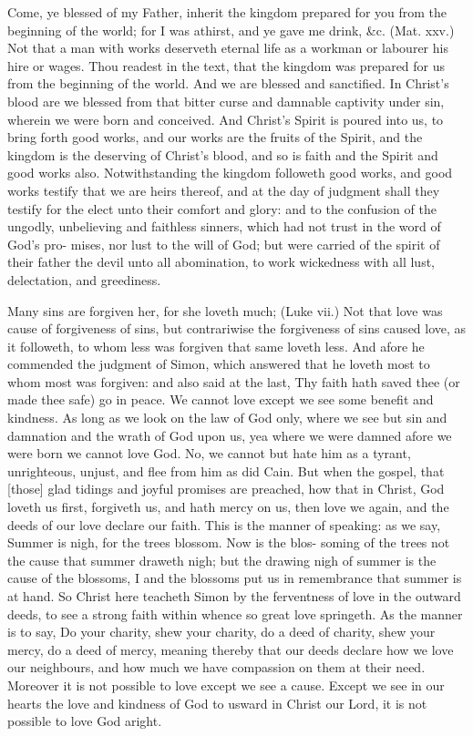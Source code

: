 \documentclass{custom}
\begin{document}
Come, ye blessed of my Father, inherit the kingdom 
prepared for you from the beginning of the world; for I 
was athirst, and ye gave me drink, \&c. (Mat. xxv.) Not
that a man with works deserveth eternal life as a workman 
or labourer his hire or wages. Thou readest in the text, 
that the kingdom was prepared for us from the beginning of 
the world. And we are blessed and sanctified. In Christ's 
blood are we blessed from that bitter curse and damnable 
captivity under sin, wherein we were born and conceived. 
And Christ's Spirit is poured into us, to bring forth good 
works, and our works are the fruits of the Spirit, and the 
kingdom is the deserving of Christ's blood, and so is faith 
and the Spirit and good works also. Notwithstanding the 
kingdom followeth good works, and good works testify that 
we are heirs thereof, and at the day of judgment shall they 
testify for the elect unto their comfort and glory: and to 
the confusion of the ungodly, unbelieving and faithless 
sinners, which had not trust in the word of God's pro- 
mises, nor lust to the will of God; but were carried of 
the spirit of their father the devil unto all abomination, to 
work wickedness with all lust, delectation, and greediness. 

Many sins are forgiven her, for she loveth much; 
(Luke vii.) Not that love was cause of forgiveness of sins,
but contrariwise the forgiveness of sins caused love, as it 
followeth, to whom less was forgiven that same loveth less. 
And afore he commended the judgment of Simon, which 
answered that he loveth most to whom most was forgiven: 
and also said at the last, Thy faith hath saved thee (or 
made thee safe) go in peace. We cannot love except we 
see some benefit and kindness. As long as we look on
the law of God only, where we see but sin and damnation
and the wrath of God upon us, yea where we were damned 
afore we were born we cannot love God. No, we cannot 
but hate him as a tyrant, unrighteous, unjust, and 
flee from him as did Cain. But when the gospel, that [those] 
glad tidings and joyful promises are preached, how that in 
Christ, God loveth us first, forgiveth us, and hath mercy on 
us, then love we again, and the deeds of our love declare 
our faith. This is the manner of speaking: as we say, 
Summer is nigh, for the trees blossom. Now is the blos- 
soming of the trees not the cause that summer draweth 
nigh; but the drawing nigh of summer is the cause of 
the blossoms, I and the blossoms put us in remembrance 
that summer is at hand. So Christ here teacheth Simon 
by the ferventness of love in the outward deeds, to see a 
strong faith within whence so great love springeth. As 
the manner is to say, Do your charity, shew your charity, 
do a deed of charity, shew your mercy, do a deed of mercy, 
meaning thereby that our deeds declare how we love our 
neighbours, and how much we have compassion on them 
at their need. Moreover it is not possible to love except 
we see a cause. Except we see in our hearts the love and 
kindness of God to usward in Christ our Lord, it is not 
possible to love God aright. 
\end{document}
